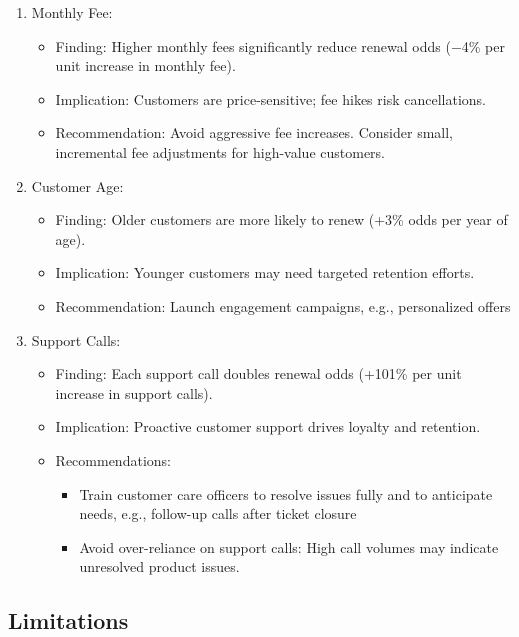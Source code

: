 \documentclass[
]{article}
\begin{document}
\begin{enumerate}
\def\labelenumi{\arabic{enumi}.}
\item
  Monthly Fee:

  \begin{itemize}
  \item
    Finding: Higher monthly fees significantly reduce renewal odds (−4\%
    per unit increase in monthly fee).
  \item
    Implication: Customers are price-sensitive; fee hikes risk
    cancellations.
  \item
    Recommendation: Avoid aggressive fee increases. Consider small,
    incremental fee adjustments for high-value customers.
  \end{itemize}
\item
  Customer Age:

  \begin{itemize}
  \item
    Finding: Older customers are more likely to renew (+3\% odds per
    year of age).
  \item
    Implication: Younger customers may need targeted retention efforts.
  \item
    Recommendation: Launch engagement campaigns, e.g., personalized
    offers
  \end{itemize}
\item
  Support Calls:

  \begin{itemize}
  \item
    Finding: Each support call doubles renewal odds (+101\% per unit
    increase in support calls).
  \item
    Implication: Proactive customer support drives loyalty and
    retention.
  \item
    Recommendations:

    \begin{itemize}
    \item
      Train customer care officers to resolve issues fully and to
      anticipate needs, e.g., follow-up calls after ticket closure
    \item
      Avoid over-reliance on support calls: High call volumes may
      indicate unresolved product issues.
    \end{itemize}
  \end{itemize}
\end{enumerate}

\subsection{Limitations}\label{limitations}
\end{document}
